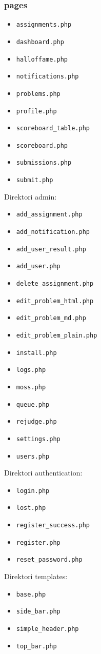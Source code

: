 \subsubsection{pages}
\begin{itemize}
	\item \texttt{assignments.php}
	\item \texttt{dashboard.php}
	\item \texttt{halloffame.php}
	\item \texttt{notifications.php}
	\item \texttt{problems.php}
	\item \texttt{profile.php}
	\item \texttt{scoreboard\_table.php}
	\item \texttt{scoreboard.php}
	\item \texttt{submissions.php}
	\item \texttt{submit.php}
\end{itemize}
Direktori admin:
\begin{itemize}
	\item \texttt{add\_assignment.php}
	\item \texttt{add\_notification.php}
	\item \texttt{add\_user\_result.php}
	\item \texttt{add\_user.php}
	\item \texttt{delete\_assignment.php}
	\item \texttt{edit\_problem\_html.php}
	\item \texttt{edit\_problem\_md.php}
	\item \texttt{edit\_problem\_plain.php}
	\item \texttt{install.php}
	\item \texttt{logs.php}
	\item \texttt{moss.php}
	\item \texttt{queue.php}
	\item \texttt{rejudge.php}
	\item \texttt{settings.php}
	\item \texttt{users.php}
\end{itemize}
Direktori authentication:
\begin{itemize}
	\item \texttt{login.php}
	\item \texttt{lost.php}
	\item \texttt{register\_success.php}
	\item \texttt{register.php}
	\item \texttt{reset\_password.php}
\end{itemize}
Direktori templates:
\begin{itemize}
	\item \texttt{base.php}
	\item \texttt{side\_bar.php}
	\item \texttt{simple\_header.php}
	\item \texttt{top\_bar.php}
\end{itemize}

